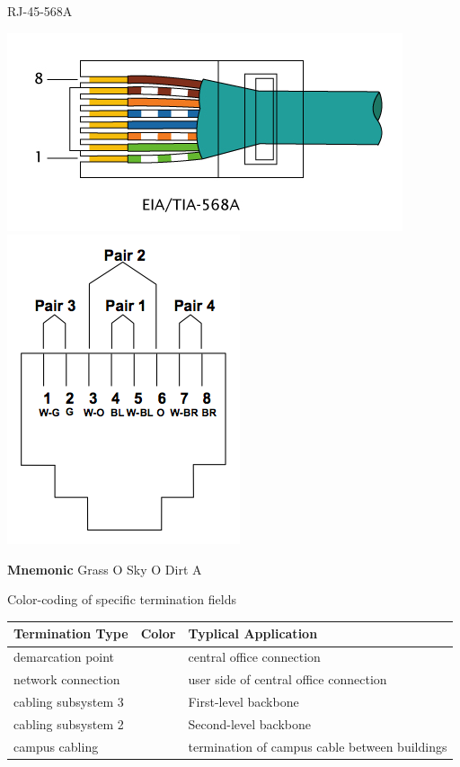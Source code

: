 \documentclass[landscape,fontscale=1,margin=0.2cm,paperwidth=70truecm, paperheight=40truecm,debug]{baposter}
\begin{document}
\begin{poster}
\begin{posterbox}[column=2,below=auto,textborder=rounded]{RJ-45-568A}
\begin{center}
\includegraphics{RJ-45_TIA-568A_Left.png}\includegraphics[scale=0.2]{pinpair.png}
\end{center}
\textbf{Mnemonic}
Grass O Sky O Dirt A
\end{posterbox}
\begin{posterbox}[column=2,below=auto,textborder=rounded]{Color-coding of specific termination fields}
\begin{center}
\begin{tabular}{lll}
Termination Type & Color & Typlical Application\\\hline
demarcation point & \color{orange}{orange} & central office connection\\
network connection & \color{green}{green}& user side of central office connection\\
cabling subsystem 3 & \colorbox{darkgray}{\color{white}{white}}& First-level backbone\\
cabling subsystem 2 & \color{gray}{gray} & Second-level backbone\\
campus cabling & \color{brown}{brown} & termination of campus cable between buildings\\

\end{tabular}
\end{center}
\end{posterbox}
\end{poster}
\end{document}
